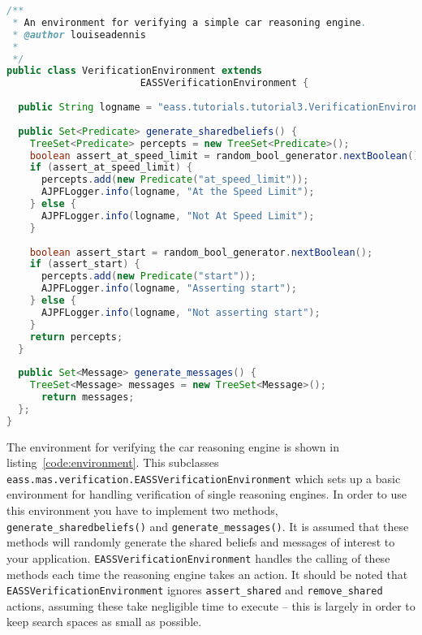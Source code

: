\documentclass[a4]{article}
\begin{document}
\begin{lstlisting}[float,caption=A Verification Environment,basicstyle=\sffamily,style=easslisting,language=Java,label=code:environment]
/**
 * An environment for verifying a simple car reasoning engine.
 * @author louiseadennis
 *
 */
public class VerificationEnvironment extends 
                       EASSVerificationEnvironment {
			
  public String logname = "eass.tutorials.tutorial3.VerificationEnvironment";
	
  public Set<Predicate> generate_sharedbeliefs() {
    TreeSet<Predicate> percepts = new TreeSet<Predicate>();
    boolean assert_at_speed_limit = random_bool_generator.nextBoolean();
    if (assert_at_speed_limit) {
      percepts.add(new Predicate("at_speed_limit"));
      AJPFLogger.info(logname, "At the Speed Limit");
    } else {
      AJPFLogger.info(logname, "Not At Speed Limit");
    }
		
    boolean assert_start = random_bool_generator.nextBoolean();
    if (assert_start) {
      percepts.add(new Predicate("start"));
      AJPFLogger.info(logname, "Asserting start");
    } else {
      AJPFLogger.info(logname, "Not asserting start");
    }
    return percepts;
  }
	
  public Set<Message> generate_messages() {
    TreeSet<Message> messages = new TreeSet<Message>();
      return messages;
  };
}
\end{lstlisting}
\begin{sloppypar}
The environment for verifying the car reasoning engine is shown in listing~\ref{code:environment}.  This subclasses \texttt{eass.mas.verification.EASSVerificationEnvironment} which sets up a basic environment for handling verification of single reasoning engines.  In order to use this environment you have to implement two methods, \texttt{generate\_sharedbeliefs()} and \texttt{generate\_messages()}.  It is assumed that these methods will randomly generate the shared beliefs and messages of interest to your application.  \texttt{EASSVerificationEnvironment} handles the calling of these methods each time the reasoning engine takes an action.  It should be noted that \texttt{EASSVerificationEnvironment} ignores \lstinline{assert_shared} and \lstinline{remove_shared} actions, assuming these take negligible time to execute -- this is largely in order to keep search spaces as small as possible.
\end{sloppypar}
\end{document}
